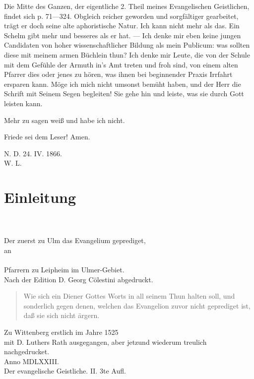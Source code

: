 Die Mitte des Ganzen, der eigentliche 2. Theil meines Evangelischen Geistlichen, findet sich p. 71—324. Obgleich reicher geworden und sorgfältiger gearbeitet, trägt er doch seine alte aphoristische Natur. Ich kann nicht mehr als das. Ein Schelm gibt mehr und besseres als er hat. — Ich denke mir eben keine jungen Candidaten von hoher wissenschaftlicher Bildung als mein Publicum: was sollten diese mit meinem armen Büchlein thun? Ich denke mir Leute, die von der Schule mit dem Gefühle der Armuth in’s Amt treten und froh sind, von einem alten Pfarrer dies oder jenes zu hören, was ihnen bei beginnender Praxis Irrfahrt ersparen kann. Möge ich mich nicht umsonst bemüht haben, und der Herr die Schrift mit Seinem Segen begleiten! Sie gehe hin und leiste, was sie durch Gott leisten kann.

Mehr zu sagen weiß und habe ich nicht.

Friede sei dem Leser! Amen.

\begin{unterschrift}
N. D. 24. IV. 1866.\\[0.8em]
W. L.
\end{unterschrift}

\chapter{Einleitung}
\begin{titelseite}
\\[1em]
\\[1em]
Der zuerst zu Ulm das Evangelium geprediget,\\[0.8em]
an\\[0.8em]
\\
Pfarrern zu Leipheim im Ulmer-Gebiet.\\[1.5em]
Nach der Edition D. Georg Cölestini abgedruckt.

\begin{quote}
Wie sich ein Diener Gottes Worts in all seinem Thun halten soll, und sonderlich gegen denen, welchen das Evangelion zuvor nicht geprediget ist, daß sie sich nicht ärgern.
\end{quote}

\begin{center}
Zu Wittenberg erstlich im Jahre 1525\\[0.8em]
mit D. Luthers Rath ausgegangen, aber jetzund wiederum treulich nachgedrucket.\\[1.5em]
Anno MDLXXIII.\\[1.5em]
Der evangelische Geistliche. II. 3te Aufl.
\end{center}
\end{titelseite}

